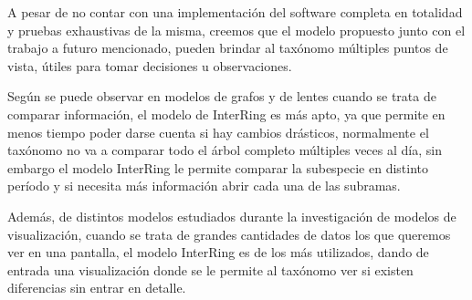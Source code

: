 \documentclass[journal]{IEEEtran}
\begin{document}
A pesar de no contar con una implementación del software completa en totalidad y pruebas exhaustivas de la misma, creemos que el modelo propuesto junto con el trabajo a futuro mencionado, pueden brindar al taxónomo múltiples puntos de vista, útiles para tomar decisiones u observaciones. 

Según se puede observar en modelos de grafos \cite{graph-explore} y de lentes \cite{lens-visual} cuando se trata de comparar información, el modelo de InterRing es más apto, ya que permite en menos tiempo poder darse cuenta si hay cambios drásticos, normalmente el taxónomo no va a comparar todo el árbol completo múltiples veces al día, sin embargo el modelo InterRing le permite comparar la subespecie en distinto período y si necesita más información abrir cada una de las subramas.

Además, de distintos modelos estudiados durante la investigación de modelos de visualización, cuando se trata de grandes cantidades de datos los que queremos ver en una pantalla, el modelo InterRing es de los más utilizados, dando de entrada una visualización donde se le permite al taxónomo ver si existen diferencias sin entrar en detalle.







%
\end{document}
